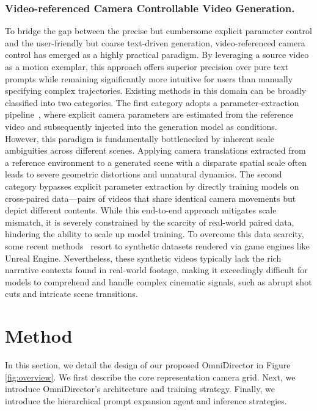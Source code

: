 \documentclass[letterpaper]{article} %
\begin{document}
\subsubsection{Video-referenced Camera Controllable Video Generation.} To bridge the gap between the precise but cumbersome explicit parameter control and the user-friendly but coarse text-driven generation, video-referenced camera control has emerged as a highly practical paradigm. By leveraging a source video as a motion exemplar, this approach offers superior precision over pure text prompts while remaining significantly more intuitive for users than manually specifying complex trajectories. Existing methods in this domain can be broadly classified into two categories. The first category adopts a parameter-extraction pipeline~\cite{wang2024motionctrl, he2024cameractrl, xu2024camco, zheng2024cami2v}, where explicit camera parameters are estimated from the reference video and subsequently injected into the generation model as conditions. However, this paradigm is fundamentally bottlenecked by inherent scale ambiguities across different scenes. Applying camera translations extracted from a reference environment to a generated scene with a disparate spatial scale often leads to severe geometric distortions and unnatural dynamics.
The second category bypasses explicit parameter extraction by directly training models on cross-paired data—pairs of videos that share identical camera movements but depict different contents. While this end-to-end approach \cite{luo2025camclonemaster, ling2024motionclone, hu2024motionmaster} mitigates scale mismatch, it is severely constrained by the scarcity of real-world paired data, hindering the ability to scale up model training. To overcome this data scarcity, some recent methods~\cite{li2024director3d, he2025cameractrlii} resort to synthetic datasets rendered via game engines like Unreal Engine. Nevertheless, these synthetic videos typically lack the rich narrative contexts found in real-world footage, making it exceedingly difficult for models to comprehend and handle complex cinematic signals, such as abrupt shot cuts and intricate scene transitions.
\vspace{-0.5cm}

\section{Method}

In this section, we detail the design of our proposed OmniDirector in Figure \ref{fig:overview}. We first describe the core representation camera grid. Next, we introduce OmniDirector’s architecture and training strategy. Finally, we introduce the hierarchical prompt expansion agent and inference strategies.
\end{document}
